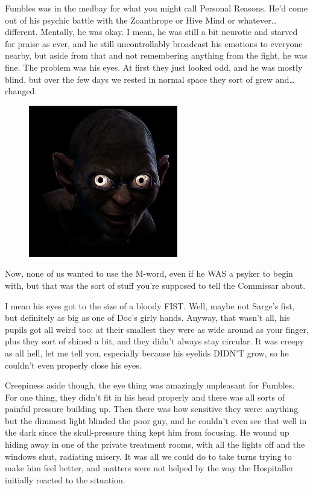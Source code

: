 Fumbles was in the medbay for what you might call Personal Reasons. 
He'd come out of his psychic battle with the Zoanthrope or Hive Mind or whatever… different. 
Mentally, he was okay. 
I mean, he was still a bit neurotic and starved for praise as ever, and he still uncontrollably broadcast his emotions to everyone nearby, but aside from that and not remembering anything from the fight, he was fine. 
The problem was his eyes. 
At first they just looked odd, and he was mostly blind, but over the few days we rested in normal space they sort of grew and… changed.
\begin{figure}
	\begin{center}
		\includegraphics[width=\figwidth]{pics/12/78.png}
	\end{center}
\end{figure}
Now, none of us wanted to use the M-word, even if he WAS a psyker to begin with, but that was the sort of stuff you're supposed to tell the Commissar about.

I mean his eyes got to the size of a bloody FIST. 
Well, maybe not Sarge's fist, but definitely as big as one of Doc's girly hands. 
Anyway, that wasn't all, his pupils got all weird too: 
at their smallest they were as wide around as your finger, plus they sort of shined a bit, and they didn't always stay circular. 
It was creepy as all hell, let me tell you, especially because his eyelids DIDN'T grow, so he couldn't even properly close his eyes.

Creepiness aside though, the eye thing was amazingly unpleasant for Fumbles. 
For one thing, they didn't fit in his head properly and there was all sorts of painful pressure building up. 
Then there was how sensitive they were: 
anything but the dimmest light blinded the poor guy, and he couldn't even see that well in the dark since the skull-pressure thing kept him from focusing. 
He wound up hiding away in one of the private treatment rooms, with all the lights off and the windows shut, radiating misery. 
It was all we could do to take turns trying to make him feel better, and matters were not helped by the way the Hospitaller initially reacted to the situation.

